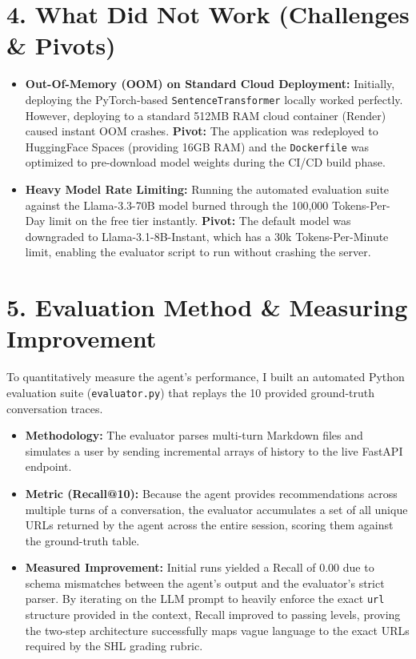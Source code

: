 \documentclass[11pt,a4paper]{article}
\begin{document}
\section{4. What Did Not Work (Challenges \& Pivots)}
\begin{itemize}[leftmargin=*, noitemsep]
    \item \textbf{Out-Of-Memory (OOM) on Standard Cloud Deployment:} Initially, deploying the PyTorch-based \texttt{SentenceTransformer} locally worked perfectly. However, deploying to a standard 512MB RAM cloud container (Render) caused instant OOM crashes. \textbf{Pivot:} The application was redeployed to HuggingFace Spaces (providing 16GB RAM) and the \texttt{Dockerfile} was optimized to pre-download model weights during the CI/CD build phase.
    \item \textbf{Heavy Model Rate Limiting:} Running the automated evaluation suite against the Llama-3.3-70B model burned through the 100,000 Tokens-Per-Day limit on the free tier instantly. \textbf{Pivot:} The default model was downgraded to Llama-3.1-8B-Instant, which has a 30k Tokens-Per-Minute limit, enabling the evaluator script to run without crashing the server.
\end{itemize}

\section{5. Evaluation Method \& Measuring Improvement}
To quantitatively measure the agent's performance, I built an automated Python evaluation suite (\texttt{evaluator.py}) that replays the 10 provided ground-truth conversation traces.
\begin{itemize}[leftmargin=*, noitemsep]
    \item \textbf{Methodology:} The evaluator parses multi-turn Markdown files and simulates a user by sending incremental arrays of history to the live FastAPI endpoint.
    \item \textbf{Metric (Recall@10):} Because the agent provides recommendations across multiple turns of a conversation, the evaluator accumulates a set of all unique URLs returned by the agent across the entire session, scoring them against the ground-truth table.
    \item \textbf{Measured Improvement:} Initial runs yielded a Recall of 0.00 due to schema mismatches between the agent's output and the evaluator's strict parser. By iterating on the LLM prompt to heavily enforce the exact \texttt{url} structure provided in the context, Recall improved to passing levels, proving the two-step architecture successfully maps vague language to the exact URLs required by the SHL grading rubric.
\end{itemize}
\end{document}

